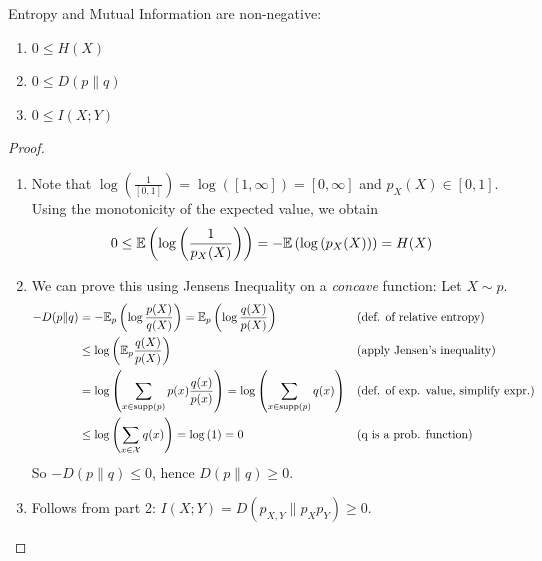 \begin{corollary}
    Entropy and Mutual Information are non-negative:
    \begin{enumerate}
        \item $0 \le H(X)$
        \item $0 \le D(p \| q)$
        \item $0 \le I(X; Y)$
    \end{enumerate}
\end{corollary}
\begin{proof}
    \begin{enumerate}
        \item 
            Note that $\log(\frac{1}{[0, 1]}) = \log([1, \infty]) = [0, \infty]$ 
            and $p_X(X) \in [0, 1]$. \\
            Using the monotonicity of the expected value, we obtain
            \[
                0 \le \mathbb{E}\left(\log \left(\frac{1}{p_X(X)}\right)\right)
                = -\mathbb{E}\left(\log \left(p_X(X)\right)\right) = H(X)
            \]

        \item 
            We can prove this using Jensens Inequality on a \textit{concave} function: %
            Let $X \sim p$. 
            \begin{align*}
                -D(p \| q) &= -\mathbb{E}_{p}\left(\log \frac{p(X)}{q(X)}\right)
                = \mathbb{E}_{p}\left(\log \frac{q(X)}{p(X)}\right)                          && \text{(def. of relative entropy)}            \\
                &\le \log\left(\mathbb{E}_{p} \frac{q(X)}{p(X)}\right)                      && \text{(apply Jensen's inequality)} \\
                &= \log\left(\sum_{x \in \operatorname{supp}(p)}{p(x) \frac{q(x)}{p(x)}}\right)
                = \log\left(\sum_{x \in \operatorname{supp}(p)}{q(x)}\right)                              && \text{(def. of exp. value, simplify expr.)}  \\
                &\le \log\left(\sum_{x \in \mathcal{X}}{q(x)}\right) = \log\left(1\right) = 0 && \text{(q is a prob. function)}
            \end{align*}
            So $-D(p \| q) \le 0$, hence $D(p \| q) \ge 0$.
        \item Follows from part 2: $I(X; Y) = D(p_{X,Y} \| p_X p_Y) \ge 0$.
    \end{enumerate}
\end{proof}


